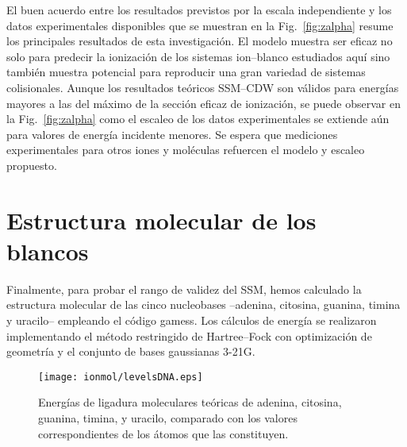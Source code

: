 El buen acuerdo entre los resultados previstos por la escala 
independiente y los datos experimentales disponibles que se muestran en 
la Fig.~\ref{fig:zalpha} resume los principales resultados de esta 
investigación. El modelo muestra ser eficaz no solo para predecir la 
ionización de los sistemas ion--blanco estudiados aquí sino también 
muestra potencial para reproducir una gran variedad de sistemas 
colisionales. Aunque los resultados teóricos SSM--CDW son válidos para 
energías mayores a las del máximo de la sección eficaz de ionización, 
se puede observar en la Fig.~\ref{fig:zalpha} como el escaleo de los 
datos experimentales se extiende aún para valores de energía incidente 
menores. Se espera que mediciones experimentales para otros iones y 
moléculas refuercen el modelo y escaleo propuesto.

\section{Estructura molecular de los blancos}
\label{sec:molcalculations}

Finalmente, para probar el rango de validez del SSM, hemos calculado la 
estructura molecular de las cinco nucleobases --adenina, citosina, 
guanina, timina y uracilo-- empleando el código {\sc gamess}. Los 
cálculos de energía se realizaron implementando el método restringido de 
Hartree--Fock con optimización de geometría y el conjunto de bases 
gaussianas 3-21G. 

\begin{figure}[t]
\centering
\texttt{[image: ionmol/levelsDNA.eps]}
\caption[Energías de ligadura moleculares teóricas de ADN y ARN.]
{Energías de ligadura moleculares teóricas de adenina, citosina, 
guanina, timina, y uracilo, comparado con los valores correspondientes 
de los átomos que las constituyen.}
\label{fig:bindener}
\end{figure}

